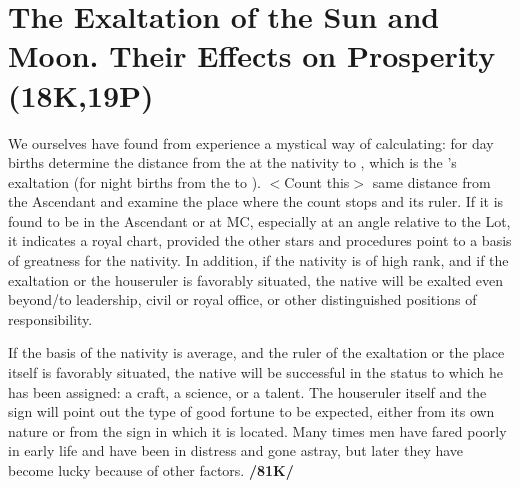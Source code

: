 \section{The Exaltation of the Sun and Moon. Their Effects on Prosperity (18K,19P)}

We ourselves have found from experience a mystical way of calculating: for day births determine the distance from the \Sun\xspace at the nativity to \Aries, which is the \Sun’s exaltation (for night births from the \Moon\xspace to \Taurus). $<$Count this$>$ same distance from the Ascendant and examine the place where the count stops and its ruler. If it is found to be in the Ascendant or at MC, especially at an angle relative to the Lot, it
indicates a royal chart, provided the other stars and procedures point to a basis of greatness for the nativity. In addition, if the nativity is of high rank, and if the exaltation or the houseruler is favorably situated, the native will be exalted even beyond/to leadership, civil or royal office, or other distinguished positions of responsibility. 

If the basis of the nativity is average, and the ruler of the exaltation or the place itself is favorably situated, the native will be successful in the status to which he has been assigned: a craft, a science, or a talent. The houseruler itself and the sign will point out the type of good fortune to be expected, either from its own nature or from the sign in which it is located. Many times men have fared poorly in early life and have been in distress and gone astray, but later they have become lucky because of other factors. \textbf{/81K/}

\newpage